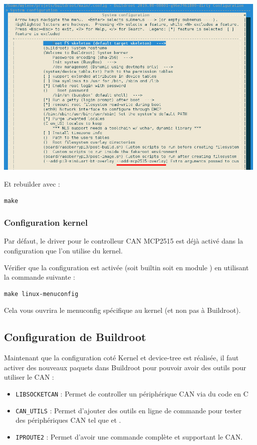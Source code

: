 \begin{centering}
\includegraphics[height=0.4\textheight]{pictures/04_labs/config_br_overlay.jpg} \\
\end{centering}

Et rebuilder avec :

\begin{verbatim}
make
\end{verbatim}

\subsubsection{Configuration kernel}

Par défaut, le driver pour le controlleur CAN MCP2515 est déjà activé dans
la configuration que l'on utilise du kernel.

Vérifier que la configuration  est activée (soit builtin 
soit en module ) en utilisant la commande suivante :

\begin{verbatim}
make linux-menuconfig
\end{verbatim}

Cela vous ouvrira le menuconfig spécifique au kernel (et non pas à Buildroot).

\subsection{Configuration de Buildroot}

Maintenant que la configuration coté Kernel et device-tree est réalisée, il
faut activer des nouveaux paquets dans Buildroot pour pouvoir avoir des
outils pour utiliser le CAN :
\begin{itemize}
\item \texttt{LIBSOCKETCAN} : Permet de controller un périphérique CAN via du code en C
\item \texttt{CAN\_UTILS} : Permet d'ajouter des outils en ligne de commande pour
  tester des périphériques CAN tel que  et .
\item \texttt{IPROUTE2} : Permet d'avoir une commande  complète et
  supportant le CAN.
\end{itemize}

